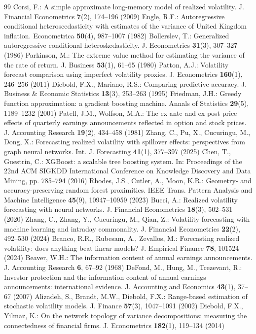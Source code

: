\documentclass[runningheads,a4paper]{llncs}
\begin{document}
\begin{thebibliography}{99}
 Corsi, F.: A simple approximate long-memory model of realized volatility. J. Financial Econometrics \textbf{7}(2), 174--196 (2009)
 Engle, R.F.: Autoregressive conditional heteroscedasticity with estimates of the variance of United Kingdom inflation. Econometrica \textbf{50}(4), 987--1007 (1982)
 Bollerslev, T.: Generalized autoregressive conditional heteroskedasticity. J. Econometrics \textbf{31}(3), 307--327 (1986)
 Parkinson, M.: The extreme value method for estimating the variance of the rate of return. J. Business \textbf{53}(1), 61--65 (1980)
 Patton, A.J.: Volatility forecast comparison using imperfect volatility proxies. J. Econometrics \textbf{160}(1), 246--256 (2011)
 Diebold, F.X., Mariano, R.S.: Comparing predictive accuracy. J. Business \& Economic Statistics \textbf{13}(3), 253--263 (1995)
 Friedman, J.H.: Greedy function approximation: a gradient boosting machine. Annals of Statistics \textbf{29}(5), 1189--1232 (2001)
 Patell, J.M., Wolfson, M.A.: The ex ante and ex post price effects of quarterly earnings announcements reflected in option and stock prices. J. Accounting Research \textbf{19}(2), 434--458 (1981)
 Zhang, C., Pu, X., Cucuringu, M., Dong, X.: Forecasting realized volatility with spillover effects: perspectives from graph neural networks. Int. J. Forecasting \textbf{41}(1), 377--397 (2025)
 Chen, T., Guestrin, C.: XGBoost: a scalable tree boosting system. In: Proceedings of the 22nd ACM SIGKDD International Conference on Knowledge Discovery and Data Mining, pp. 785--794 (2016)
 Rhodes, J.S., Cutler, A., Moon, K.R.: Geometry- and accuracy-preserving random forest proximities. IEEE Trans. Pattern Analysis and Machine Intelligence \textbf{45}(9), 10947--10959 (2023)
 Bucci, A.: Realized volatility forecasting with neural networks. J. Financial Econometrics \textbf{18}(3), 502--531 (2020)
 Zhang, C., Zhang, Y., Cucuringu, M., Qian, Z.: Volatility forecasting with machine learning and intraday commonality. J. Financial Econometrics \textbf{22}(2), 492--530 (2024)
 Branco, R.R., Rubesam, A., Zevallos, M.: Forecasting realized volatility: does anything beat linear models? J. Empirical Finance \textbf{78}, 101524 (2024)
 Beaver, W.H.: The information content of annual earnings announcements. J. Accounting Research \textbf{6}, 67--92 (1968)
 DeFond, M., Hung, M., Trezevant, R.: Investor protection and the information content of annual earnings announcements: international evidence. J. Accounting and Economics \textbf{43}(1), 37--67 (2007)
 Alizadeh, S., Brandt, M.W., Diebold, F.X.: Range-based estimation of stochastic volatility models. J. Finance \textbf{57}(3), 1047--1091 (2002)
 Diebold, F.X., Yilmaz, K.: On the network topology of variance decompositions: measuring the connectedness of financial firms. J. Econometrics \textbf{182}(1), 119--134 (2014)
\end{thebibliography}
\end{document}
